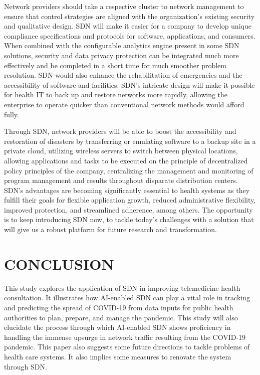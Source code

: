 \documentclass[10pt]{article}
\begin{document}
Network providers should take a respective cluster to network management to ensure that control strategies are aligned with the organization's existing security and qualitative design. SDN will make it easier for a company to develop unique compliance specifications and protocols for software, applications, and consumers. When combined with the configurable analytics engine present in some SDN solutions, security and data privacy protection can be integrated much more effectively and be completed in a short time for much smoother problem resolution. SDN would also enhance the rehabilitation of emergencies and the accessibility of software and facilities. SDN's intricate design will make it possible for health IT to back up and restore networks more rapidly, allowing the enterprise to operate quicker than conventional network methods would afford fully.

Through SDN, network providers will be able to boost the accessibility and restoration of disasters by transferring or emulating software to a backup site in a private cloud, utilizing wireless servers to switch between physical locations, allowing applications and tasks to be executed on the principle of decentralized policy principles of the company, centralizing the management and monitoring of program management and results throughout disparate distribution centers. SDN's advantages are becoming significantly essential to health systems as they fulfill their goals for flexible application growth, reduced administrative flexibility, improved protection, and streamlined adherence, among others. The opportunity is to keep introducing SDN now, to tackle today's challenges with a solution that will give us a robust platform for future research and transformation.

\section{CONCLUSION}
This study explores the application of SDN in improving telemedicine health consultation. It illustrates how AI-enabled SDN can play a vital role in tracking and predicting the spread of COVID-19 from data inputs for public health authorities to plan, prepare, and manage the pandemic. This study will also elucidate the process through which AI-enabled SDN shows proficiency in handling the immense upsurge in network traffic resulting from the COVID-19 pandemic. This paper also suggests some future directions to tackle problems of health care systems. It also implies some measures to renovate the system through SDN.
\end{document}
